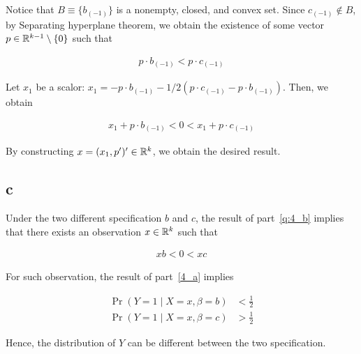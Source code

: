\documentclass[11pt]{article}
\begin{document}
Notice that $B \equiv \{b_{(-1)}\}$ is a nonempty, closed, and convex set. Since $c_{(-1)} \notin B$, by Separating hyperplane theorem, we obtain the existence of some vector $p \in \mathbb{R}^{k-1}\setminus \{0\}$ such that

\begin{align*}
    p \cdot b_{(-1)} < p \cdot c_{(-1)}
\end{align*}

Let $x_1$ be a scalor: $x_1 = - p \cdot b_{(-1)} - 1/2 (p\cdot c_{(-1)} - p \cdot b_{(-1)})$. Then, we obtain

\begin{align*}
    x_1 + p \cdot b_{(-1)} < 0 < x_1 + p \cdot c_{(-1)}
\end{align*}

By constructing $x = (x_1, p^\prime)^\prime \in \mathbb{R}^k$, we obtain the desired result.

\subsection*{c}

Under the two different specification $b$ and $c$, the result of part~\ref{q:4_b} implies that there exists an observation $x \in \mathbb{R}^k$ such that

\begin{align*}
    xb < 0 < xc
\end{align*}

For such observation, the result of part~\ref{4_a} implies

\begin{align*}
    \Pr(Y = 1 \mid X = x, \beta = b) &< \frac{1}{2} \\
    \Pr(Y = 1 \mid X = x, \beta = c) &> \frac{1}{2}
\end{align*}

Hence, the distribution of $Y$ can be different between the two specification.
\end{document}
